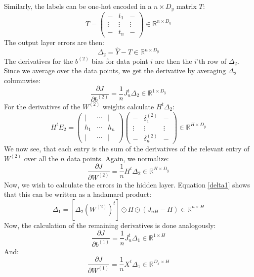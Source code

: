 \documentclass[12pt, a4paper]{article}
\numberwithin{equation}{section}
\begin{document}
Similarly, the labels can be one-hot encoded in a $n\times D_y$ matrix $T$:
\begin{equation}
T=
\begin{pmatrix}
- & t_1 & - \\
\vdots & \vdots & \vdots \\
- & t_n & -
\end{pmatrix}
\in\mathbb{R}^{n\times D_y}
\end{equation}
The output layer errors are then:
\begin{equation}
\Delta_2=\hat{Y}-T\in\mathbb{R}^{n\times D_y}
\end{equation}
The derivatives for the $b^{(2)}$ bias for data point $i$ are then the $i$'th row of $\Delta_2$. Since we average over the data points, we get the derivative by averaging $\Delta_2$ columnwise:
\begin{equation}
\frac{\partial J}{\partial b^{(2)}}=\frac{1}{n}J_n^t \Delta_2\in\mathbb{R}^{1\times D_y}
\end{equation}
For the derivatives of the $W^{(2)}$ weights calculate $H^t\Delta_2$:
\begin{equation}
H^t E_2=
\begin{pmatrix}
| & \cdots & | \\
h_1 & \cdots & h_n \\
| & \cdots & |
\end{pmatrix}
\begin{pmatrix}
- & \delta^{(2)}_1 & - \\
\vdots & \vdots & \vdots \\
- & \delta^{(2)}_n & -
\end{pmatrix}
\in\mathbb{R}^{H\times D_y}
\end{equation}
We now see, that each entry is the sum of the derivatives of the relevant entry of $W^{(2)}$ over all the $n$ data points. Again, we normalize:
\begin{equation}
\frac{\partial J}{\partial W^{(2)}}=\frac{1}{n}H^t \Delta_2\in\mathbb{R}^{H\times D_y}
\end{equation}
Now, we wish to calculate the errors in the hidden layer. Equation \ref{delta1} shows that this can be written as a hadamard product:
\begin{equation}
\Delta_1=\left[\Delta_2 \left(W^{(2)}\right)^t\right]\odot H\odot(J_{nH}-H)\in\mathbb{R}^{n\times H}
\end{equation}
Now, the calculation of the remaining derivatives is done analogously:
\begin{equation}
\frac{\partial J}{\partial b^{(1)}}=\frac{1}{n}J_n^t \Delta_1\in\mathbb{R}^{1\times H}
\end{equation}
And:
\begin{equation}
\frac{\partial J}{\partial W^{(1)}}=\frac{1}{n}X^t \Delta_1\in\mathbb{R}^{D_x\times H}
\end{equation}
\end{document}
